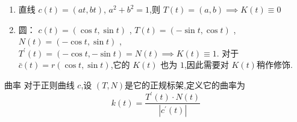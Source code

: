 \documentclass[../../古典微分几何.tex]{subfiles}
\begin{document}
\begin{example}
    \begin{enumerate}
        \item 直线 \(  c\left( t \right)= \left( at,bt \right)    \), \(  a^{2}+ b^{2}= 1  \),则 \(  T\left( t \right)= \left( a,b \right)\implies K\left( t \right)\equiv 0     \)  
        \item 圆： \(  c\left( t \right)= \left( \cos t,\sin t \right)    \)  , \(  T\left( t \right)=  \left( -\sin t,\cos t \right)    \) ,\(  N\left( t \right)= \left( -\cos t,\sin t \right)    \) , \(  T^{\prime} \left( t \right)= \left( -\cos t,-\sin t \right)    = N\left( t \right)\implies K\left( t \right)\equiv 1  \).
        对于 \(  \bar{c}\left( t \right)   = r \left( \cos t,\sin t \right) \),它的 \(  K\left( t \right)   \) 也为 \(  1  \),因此需要对 \(  K\left( t \right)   \)稍作修饰. 
    \end{enumerate}
    
\end{example}
\hspace*{\fill} 
\begin{definition}{曲率}
    对于正则曲线 \(  c  \),设 \(  \left( T,N \right)   \)是它的正规标架,定义它的曲率为 \[
    k\left( t \right)=  \frac{T^{\prime} \left( t \right)\cdot N\left( t \right)   }{\left| c^{\prime} \left( t \right)  \right|  }  
    \]  
\end{definition}
\end{document}

